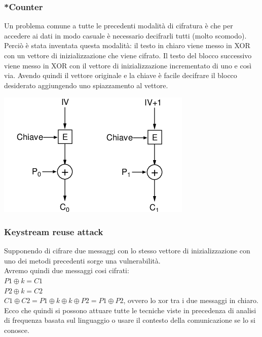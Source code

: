 \documentclass[10pt,a4paper,twoside]{article}
\begin{document}
\subsubsection{*Counter}
\begin{minipage}{0.7\textwidth}
Un problema comune a tutte le precedenti modalità di cifratura è che per accedere ai dati in modo casuale è necessario decifrarli tutti (molto scomodo). Perciò è stata inventata questa modalità: il testo in chiaro viene messo in XOR con un vettore di inizializzazione che viene cifrato. Il testo del blocco successivo viene messo in XOR con il vettore di inizializzazione incrementato di uno e così via. Avendo quindi il vettore originale e la chiave è facile decifrare il blocco desiderato aggiungendo uno spiazzamento al vettore.
\end{minipage}
\begin{minipage}{0.3\textwidth}
\includegraphics[width=\textwidth]{images/counter.png}
\end{minipage}

\subsubsection{Keystream reuse attack}
Supponendo di cifrare due messaggi con lo stesso vettore di inizializzazione con uno dei metodi precedenti sorge una vulnerabilità.\\
Avremo quindi due messaggi cosi cifrati:\\
$P1 \oplus k=C1$\\
$P2 \oplus k=C2$\\
$C1 \oplus C2=P1 \oplus k \oplus k \oplus P2=P1 \oplus P2$, ovvero lo xor tra i due messaggi in chiaro. Ecco che quindi si possono attuare tutte le tecniche viste in precedenza di analisi di frequenza basata sul linguaggio o usare il contesto della comunicazione se lo si conosce.
\end{document}
